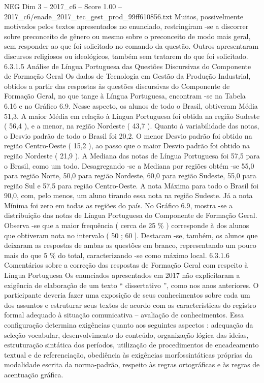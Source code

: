 \begin{textsample}{NEG Dim 3 – 2017\_c6 – Score 1.00 – 2017\_c6/enade\_2017\_tec\_gest\_prod\_99ff610856.txt}
Muitos, possivelmente motivados pelos textos apresentados no enunciado, restringiram -se a discorrer sobre preconceito de gênero ou mesmo sobre o preconceito de modo mais geral, sem responder ao que foi solicitado no comando da questão.
Outros apresentaram discursos religiosos ou ideológicos, também sem tratarem do que foi solicitado. 6.3.1.5 Análise de Língua Portuguesa das Questões Discursivas do Componente de Formação Geral Os dados de Tecnologia em Gestão da Produção Industrial, obtidos a partir das respostas às questões discursivas do Componente de Formação Geral, no que tange à Língua Portuguesa, encontram -se na Tabela 6.16 e no Gráfico 6.9.
Nesse aspecto, os alunos de todo o Brasil, obtiveram Média 51,3.
A maior Média em relação à Língua Portuguesa foi obtida na região Sudeste ( 56,4 ), e a menor, na região Nordeste ( 43,7 ).
Quanto à variabilidade das notas, o Desvio padrão de todo o Brasil foi 20,2.
O menor Desvio padrão foi obtido na região Centro-Oeste ( 15,2 ), ao passo que o maior Desvio padrão foi obtido na região Nordeste ( 21,9 ).
A Mediana das notas de Língua Portuguesa foi 57,5 para o Brasil, como um todo.
Desagregando -se a Mediana por regiões obtém -se 55,0 para região Norte, 50,0 para região Nordeste, 60,0 para região Sudeste, 55,0 para região Sul e 57,5 para região Centro-Oeste.
A nota Máxima para todo o Brasil foi 90,0, com, pelo menos, um aluno tirando essa nota na região Sudeste.
Já a nota Mínima foi zero em todas as regiões do país.
No Gráfico 6.9, mostra -se a distribuição das notas de Língua Portuguesa do Componente de Formação Geral.
Observa -se que a maior frequência ( cerca de 25 \% ) corresponde à dos alunos que obtiveram nota no intervalo ( 50 ; 60 ].
Destacam -se, também, os alunos que deixaram as respostas de ambas as questões em branco, representando um pouco mais do que 5 \% do total, caracterizando -se como máximo local. 6.3.1.6 Comentários sobre a correção das respostas de Formação Geral com respeito à Língua Portuguesa Os enunciados apresentados em 2017 não explicitaram a exigência de elaboração de um texto “ dissertativo ”, como nos anos anteriores.
O participante deveria fazer uma exposição de seus conhecimentos sobre cada um dos assuntos e estruturar seus textos de acordo com as características do registro formal adequado à situação comunicativa – avaliação de conhecimentos.
Essa configuração determina exigências quanto aos seguintes aspectos : adequação da seleção vocabular, desenvolvimento do conteúdo, organização lógica das ideias, estruturação sintática dos períodos, utilização de procedimentos de encadeamento textual e de referenciação, obediência às exigências morfossintáticas próprias da modalidade escrita da norma-padrão, respeito às regras ortográficas e às regras de acentuação gráfica.

\end{textsample}
